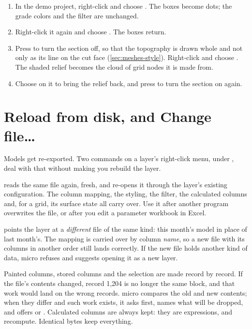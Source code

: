 \begin{tryit}
\begin{enumerate}
\item In the demo project, right-click  and choose . The boxes become dots; the grade colors and the filter are unchanged.
\item Right-click it again and choose . The boxes return.
\item Press  to turn the section off, so that the topography is drawn whole and not only as its line on the cut face (\cref{sec:meshes-style}). Right-click  and choose . The shaded relief becomes the cloud of grid nodes it is made from.
\item Choose  on it to bring the relief back, and press  to turn the section on again.
\end{enumerate}
\end{tryit}

\section{Reload from disk, and Change file…}\label{sec:opening-reload}

Models get re-exported. Two commands on a layer's right-click menu, under , deal with that without making you rebuild the layer.

 reads the same file again, fresh, and re-opens it through the layer's existing configuration. The column mapping, the styling, the filter, the calculated columns and, for a grid, its surface state all carry over. Use it after another program overwrites the file, or after you edit a parameter workbook in Excel.

 points the layer at a \emph{different} file of the same kind: this month's model in place of last month's. The mapping is carried over by column \emph{name}, so a new file with its columns in another order still lands correctly. If the new file holds another kind of data, micro refuses and suggests opening it as a new layer.

\begin{caution}
Painted columns, stored columns and the selection are made record by record. If the file's contents changed, record 1,204 is no longer the same block, and that work would land on the wrong records. micro compares the old and new contents; when they differ and such work exists, it asks first, names what will be dropped, and offers  or . Calculated columns are always kept: they are expressions, and recompute. Identical bytes keep everything.
\end{caution}

